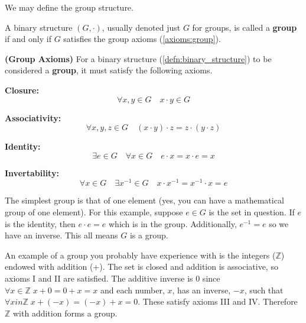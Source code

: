 We may define the group structure.
\begin{defn}
\label{defn:group}
  A binary structure $(G, \cdot)$, usually denoted just $G$ for groups, is called a \textbf{group} if and only if $G$ satisfies the group axioms (\ref{axioms:group}).
\end{defn}

\begin{axiomset}
\label{axioms:group}
  \textbf{(Group Axioms)}
  For a binary structure (\ref{defn:binary_structure}) to be considered a \textbf{group}, it must satisfy the following axioms.
  \begin{axiom}
     \textbf{Closure:}
     \begin{equation}
       \forall x,y \in G \quad x\cdot y \in G
     \end{equation}
  \end{axiom}
  \begin{axiom}
     \textbf{Associativity:}
     \begin{equation}
       \forall x,y,z \in G \quad (x\cdot y) \cdot z = z \cdot (y \cdot z)
     \end{equation}
  \end{axiom}
  \begin{axiom}
     \textbf{Identity:}
     \begin{equation}
       \exists e \in G \quad \forall x \in G \quad e\cdot x = x \cdot e = x
     \end{equation}
  \end{axiom}
  \begin{axiom}
     \textbf{Invertability:}
     \begin{equation}
       \forall x \in G \quad \exists x^{-1} \in G \quad x \cdot x^{-1} = x^{-1} \cdot x = e
     \end{equation}
  \end{axiom}
\end{axiomset}

\begin{ex}
  The simplest group is that of one element (yes, you can have a mathematical group of one element).
  For this example, suppose $e \in G$ is the set in question.
  If $e$ is the identity, then $e \cdot e = e$ which is in the group.
  Additionally, $e^{-1} = e$ so we have an inverse.
  This all means $G$ is a group.
\end{ex}

\begin{ex}
  An example of a group you probably have experience with is the integers ($\mathbb{Z}$) endowed with addition ($+$).
  The set is closed and addition is associative, so axioms I and II are satisfied.
  The additive inverse is $0$ since $\forall x \in \mathbb{Z} \; x + 0 = 0 + x = x $ and each number, $x$, has an inverse, $-x$, such that $\forall x in \mathbb{Z} \; x + (-x) = (-x) + x = 0$.
  These satisfy axioms III and IV\@.
  Therefore $\mathbb{Z}$ with addition forms a group.
\end{ex}

